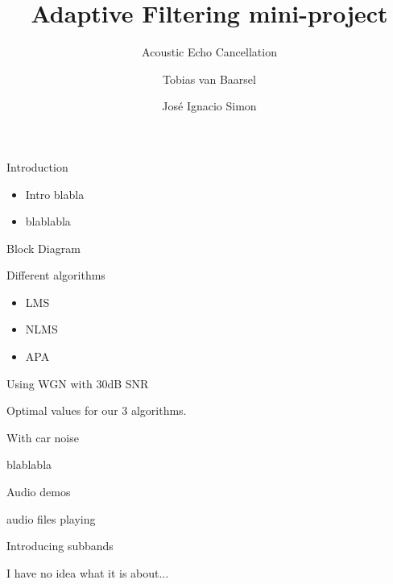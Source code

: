\documentclass[12pts]{beamer}
\begin{document}
\author{Tobias van Baarsel  \and José Ignacio Simon}
\title{Adaptive Filtering mini-project}
\subtitle{Acoustic Echo Cancellation}
\date{}


\begin{frame}{Introduction}

\begin{itemize}
\item{Intro blabla}

\item{blablabla}
\end{itemize}
\end{frame}
 
\begin{frame}{Block Diagram}

 \end{frame}
 
\begin{frame}{Different algorithms}
\begin{itemize}[<+->]
\item{LMS}
\item{NLMS}
\item{APA}

\end{itemize}
\end{frame}

\begin{frame}{Using WGN with 30dB SNR}

Optimal values for our 3 algorithms.


\end{frame}



\begin{frame}{With car noise}

blablabla

\end{frame}


\begin{frame}{Audio demos}

audio files playing

\end{frame}

\begin{frame}{Introducing subbands}

I have no idea what it is about...

\end{frame}
\end{document}
